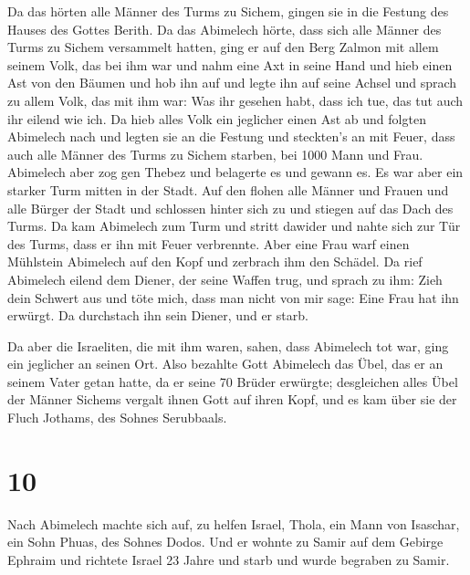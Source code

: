  Da das hörten alle Männer des Turms zu Sichem, gingen
sie in die Festung des Hauses des Gottes Berith.  Da das
Abimelech hörte, dass sich alle Männer des Turms zu Sichem versammelt
hatten,  ging er auf den Berg Zalmon mit allem seinem
Volk, das bei ihm war und nahm eine Axt in seine Hand und hieb einen Ast
von den Bäumen und hob ihn auf und legte ihn auf seine Achsel und sprach
zu allem Volk, das mit ihm war: Was ihr gesehen habt, dass ich tue, das
tut auch ihr eilend wie ich.  Da hieb alles Volk ein
jeglicher einen Ast ab und folgten Abimelech nach und legten sie an die
Festung und steckten's an mit Feuer, dass auch alle Männer des Turms zu
Sichem starben, bei 1000 Mann und Frau.  Abimelech aber
zog gen Thebez und belagerte es und gewann es.  Es war
aber ein starker Turm mitten in der Stadt. Auf den flohen alle Männer
und Frauen und alle Bürger der Stadt und schlossen hinter sich zu und
stiegen auf das Dach des Turms.  Da kam Abimelech zum
Turm und stritt dawider und nahte sich zur Tür des Turms, dass er ihn
mit Feuer verbrennte.  Aber eine Frau warf einen
Mühlstein Abimelech auf den Kopf und zerbrach ihm den Schädel.
 Da rief Abimelech eilend dem Diener, der seine Waffen
trug, und sprach zu ihm: Zieh dein Schwert aus und töte mich, dass man
nicht von mir sage: Eine Frau hat ihn erwürgt. Da durchstach ihn sein
Diener, und er starb.

 Da aber die Israeliten, die mit ihm waren, sahen, dass
Abimelech tot war, ging ein jeglicher an seinen Ort. 
Also bezahlte Gott Abimelech das Übel, das er an seinem Vater getan
hatte, da er seine 70 Brüder erwürgte;  desgleichen alles
Übel der Männer Sichems vergalt ihnen Gott auf ihren Kopf, und es kam
über sie der Fluch Jothams, des Sohnes Serubbaals.

\hypertarget{section-9}{%
\section{10}\label{section-9}}

 Nach Abimelech machte sich auf, zu helfen Israel, Thola,
ein Mann von Isaschar, ein Sohn Phuas, des Sohnes Dodos. Und er wohnte
zu Samir auf dem Gebirge Ephraim  und richtete Israel 23
Jahre und starb und wurde begraben zu Samir.

